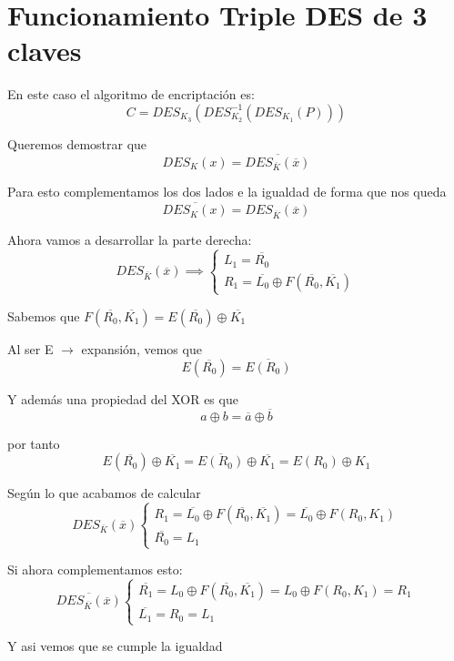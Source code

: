  \section{Funcionamiento Triple DES de 3 claves}
 
 En este caso el algoritmo de encriptación es:
 $$C = DES_{K_3}(DES^{-1}_{K_2}(DES_{K_1}(P )))$$
 
 \begin{example}
 	Queremos demostrar que 
 	$$DES_K(x) = \overline{DES_{\overline{K}}(\overline{x})}$$
 	
 	Para esto complementamos los dos lados e la igualdad de forma que nos queda
 	$$\overline{DES_K(x)} = DES_{\overline{K}}(\overline{x})$$
 	
 	Ahora vamos a desarrollar la parte derecha:
 	$$DES_{\overline{K}}(\overline{x}) \implies \begin{cases}
		L_1 = \overline{R_0}\\
		R_1 = \overline{L_0} \oplus F(\overline{R_0} , \overline{K_1})
 	\end{cases}$$
 	
 	Sabemos que $F(\overline{R_0} , \overline{K_1}) = E(\overline{R_0}) \oplus \overline{K_1}$
 	
 	Al ser E $\rightarrow$ expansión, vemos que 
 	$$E(\overline{R_0}) = \overline{E(R_0)}$$
 	
 	Y además una propiedad del XOR es que
 	$$a\oplus b = \overline{a} \oplus \overline{b}$$
 	
 	por tanto
 	$$E(\overline{R_0}) \oplus \overline{K_1} = \overline{E(R_0)} \oplus \overline{K_1} = E(R_0) \oplus K_1$$
 	
 	Según lo que acabamos de calcular
 	$$DES_{\overline{K}}(\overline{x})\begin{cases}
	 	R_1 = \overline{L_0} \oplus F(\overline{R_0} , \overline{K_1}) = \overline{L_0} \oplus F(R_0 , K_1)\\
	 	\overline{R_0} = L_1
 	\end{cases}$$
 	
 	Si ahora complementamos esto:
 	$$\overline{DES_{\overline{K}}(\overline{x})}\begin{cases}
 	\overline{R_1} = L_0 \oplus F(\overline{R_0} , \overline{K_1}) = L_0 \oplus F(R_0 , K_1) = R_1\\
 	\overline{L_1} = R_0 = L_1
 	\end{cases}$$
 	
	Y asi vemos que se cumple la igualdad 	
 \end{example}
 \newpage
 
